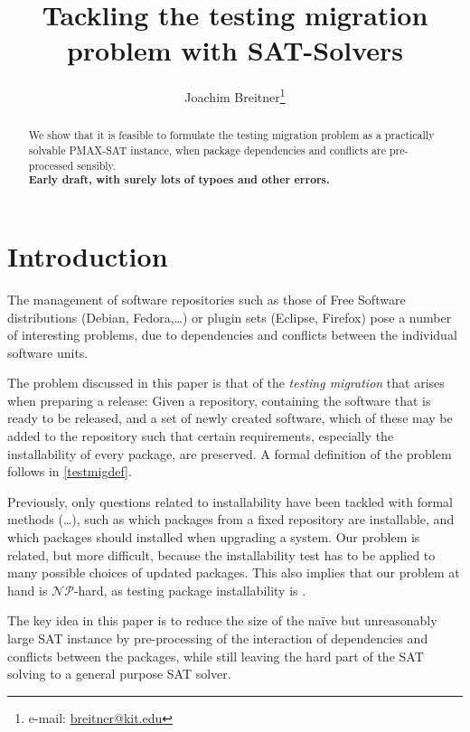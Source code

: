 \documentclass[halfparskip,11pt]{scrartcl}
\author{Joachim Breitner\footnote{e-mail: \href{mailto:breitner@kit.edu}{breitner@kit.edu}}}
\title{Tackling the testing migration problem with SAT-Solvers}
\begin{document}
\maketitle



\begin{abstract}
We show that it is feasible to formulate the testing migration problem as a practically solvable PMAX-SAT instance, when package dependencies and conflicts are pre-processed sensibly.\\

\centering
\textbf{Early draft, with surely lots of typoes and other errors.}
\end{abstract}

\tableofcontents

\section{Introduction}

The management of software repositories such as those of Free Software distributions (Debian, Fedora,\dots) or plugin sets (Eclipse, Firefox) pose a number of interesting problems, due to dependencies and conflicts between the individual software units.

The problem discussed in this paper is that of the \emph{testing migration} that arises when preparing a release: Given a repository, containing the software that is ready to be released, and a set of newly created software, which of these may be added to the repository such that certain requirements, especially the installability of every package, are preserved. A formal definition of the problem follows in \ref{testmigdef}.

Previously, only questions related to installability have been tackled with formal methods (\cite{edos}\dots), such as which packages from a fixed repository are installable, and which packages should installed when upgrading a system. Our problem is related, but more difficult, because the installability test has to be applied to many possible choices of updated packages. This also implies that our problem at hand is $\mathcal{NP}$-hard, as testing package installability is \cite{burrows}.

The key idea in this paper is to reduce the size of the naïve but unreasonably large SAT instance by pre-processing of the interaction of dependencies and conflicts between the packages, while still leaving the hard part of the SAT solving to a general purpose SAT solver.
\end{document}
